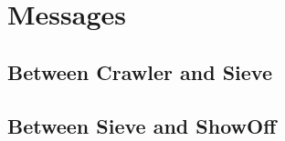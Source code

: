 \section{\label{sct:messages}Messages}


\subsection{Between Crawler and Sieve}


\subsection{Between Sieve and ShowOff}


